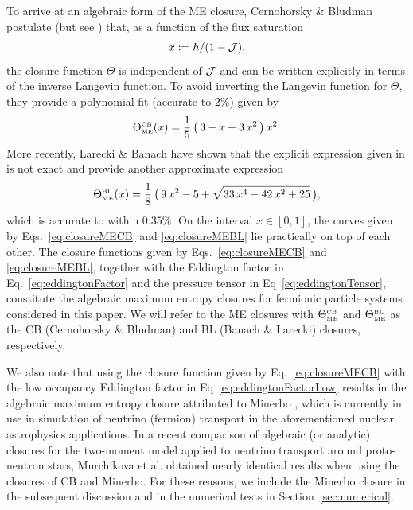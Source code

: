 To arrive at an algebraic form of the ME closure, Cernohorsky \& Bludman \cite{cernohorskyBludman_1994} postulate (but see \cite{lareckiBanach_2011}) that, as a function of the flux saturation
\begin{equation}
  x := h/(1-\mathcal{J}),
  \label{eq:fluxSaturation}
\end{equation} 
the closure function $\Theta$ is independent of $\mathcal{J}$ and can be written explicitly in terms of the inverse Langevin function.  
To avoid inverting the Langevin function for $\Theta$, they provide a polynomial fit (accurate to $2\%$) given by
\begin{equation}
  \Theta_{\mbox{\tiny ME}}^{\mbox{\tiny CB}}(x)
  =\frac{1}{5}\,\big(\,3-x+3\,x^{2}\,\big)\,x^{2}.
  \label{eq:closureMECB}
\end{equation}
More recently, Larecki \& Banach \cite{lareckiBanach_2011} have shown that the explicit expression given in \cite{cernohorskyBludman_1994} is not exact and provide another approximate expression
\begin{equation}
  \Theta_{\mbox{\tiny ME}}^{\mbox{\tiny BL}}(x)
  =\frac{1}{8}\,\big(\,9\,x^{2}-5+\sqrt{33\,x^{4}-42\,x^{2}+25}\,\big),
  \label{eq:closureMEBL}
\end{equation}
which is accurate to within $0.35\%$.  
On the interval $x\in[0,1]$, the curves given by Eqs.~\eqref{eq:closureMECB} and \eqref{eq:closureMEBL} lie practically on top of each other.  
The closure functions given by Eqs.~\eqref{eq:closureMECB} and \eqref{eq:closureMEBL}, together with the Eddington factor in Eq.~\eqref{eq:eddingtonFactor} and the pressure tensor in Eq~\eqref{eq:eddingtonTensor}, constitute the algebraic maximum entropy closures for fermionic particle systems considered in this paper.  
We will refer to the ME closures with $\Theta_{\mbox{\tiny ME}}^{\mbox{\tiny CB}}$ and $\Theta_{\mbox{\tiny ME}}^{\mbox{\tiny BL}}$ as the CB (Cernohorsky \& Bludman) and BL (Banach \& Larecki) closures, respectively.  

We also note that using the closure function given by Eq.~\eqref{eq:closureMECB} with the low occupancy Eddington factor in Eq~\eqref{eq:eddingtonFactorLow} results in the algebraic maximum entropy closure attributed to Minerbo \cite{minerbo_1978}, which is currently in use in simulation of neutrino (fermion) transport in the aforementioned nuclear astrophysics applications.  
In a recent comparison of algebraic (or analytic) closures for the two-moment model applied to neutrino transport around proto-neutron stars, Murchikova et al. \cite{murchikova_etal_2017} obtained nearly identical results when using the closures of CB and Minerbo.  
For these reasons, we include the Minerbo closure in the subsequent discussion and in the numerical tests in Section~\ref{sec:numerical}.  

